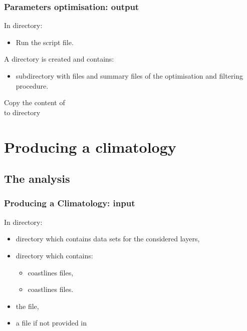 
\begin{frame}
\frametitle{Parameters optimisation: output}

\centerline{In  directory:}

\begin{itemize}
\item Run the  script file.
\end{itemize}

{A  directory is created and contains:}

\begin{itemize}
\item[ ]  subdirectory with  files and summary files of the optimisation and filtering procedure.
\end{itemize}

\vfill 
\Large{
\begin{center}
Copy the  content of \\
 to  directory
\end{center}
}

\end{frame}

\section{Producing a climatology}
\subsection{The analysis}

\begin{frame}
\frametitle{Producing a Climatology: input}

\centerline{In  directory:}

\begin{itemize}
\item {} directory which contains data sets for the considered layers,
\item {} directory which contains:
\begin{itemize}
\item[] coastlines  files,
\item[] coastlines  files.
\end{itemize}
\item the  file, 
\item a  file if not provided in 
\end{itemize}

\end{frame}


